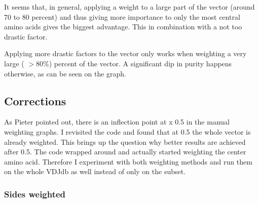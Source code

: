 \documentclass[11pt]{article}
\begin{document}
    It seems that, in general, applying a weight to a large part of the vector (around 70 to 80 percent) and thus giving more
    importance to only the most central amino acids gives the biggest advantage.
    This in combination with a not too drastic factor.

    Applying more drastic factors to the vector only works when weighting a very large ( $> 80\%$) percent of the vector.
    A significant dip in purity happens otherwise, as can be seen on the graph.

    \subsection{Corrections}

    As Pieter pointed out, there is an inflection point at x 0.5 in the manual weighting graphs.
    I revisited the code and found that at 0.5 the whole vector is already weighted.
    This brings up the question why better results are achieved after 0.5.
    The code wrapped around and actually started weighting the center amino acid.
    Therefore I experiment with both weighting methods and run them on the whole VDJdb as well instead of only on the
    subset.

    \subsubsection{Sides weighted}
\end{document}
